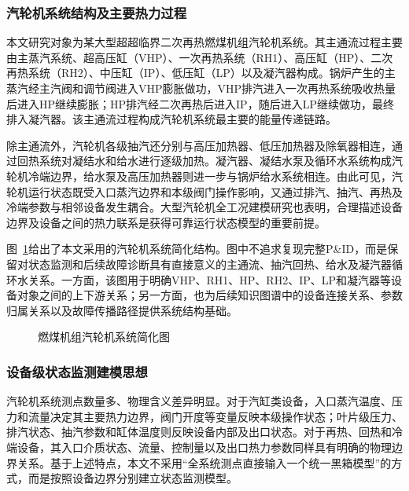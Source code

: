 \subsubsection{汽轮机系统结构及主要热力过程}

本文研究对象为某大型超超临界二次再热燃煤机组汽轮机系统。其主通流过程主要由主蒸汽系统、超高压缸（VHP）、一次再热系统（RH1）、高压缸（HP）、二次再热系统（RH2）、中压缸（IP）、低压缸（LP）以及凝汽器构成。锅炉产生的主蒸汽经主汽阀和调节阀进入VHP膨胀做功，VHP排汽进入一次再热系统吸收热量后进入HP继续膨胀；HP排汽经二次再热后进入IP，随后进入LP继续做功，最终排入凝汽器。该主通流过程构成汽轮机系统最主要的能量传递链路。

除主通流外，汽轮机各级抽汽还分别与高压加热器、低压加热器及除氧器相连，通过回热系统对凝结水和给水进行逐级加热。凝汽器、凝结水泵及循环水系统构成汽轮机冷端边界，给水泵及高压加热器则进一步与锅炉给水系统相连。由此可见，汽轮机运行状态既受入口蒸汽边界和本级阀门操作影响，又通过排汽、抽汽、再热及冷端参数与相邻设备发生耦合。大型汽轮机全工况建模研究也表明，合理描述设备边界及设备之间的热力联系是获得可靠运行状态模型的重要前提\cite{Zhang2018AllCondition,Dettori2017MonitoringModels}。

图~\ref{fig:turbine_system_modeling}给出了本文采用的汽轮机系统简化结构。图中不追求复现完整P\&ID，而是保留对状态监测和后续故障诊断具有直接意义的主通流、抽汽回热、给水及凝汽器循环水关系。一方面，该图用于明确VHP、RH1、HP、RH2、IP、LP和凝汽器等设备对象之间的上下游关系；另一方面，也为后续知识图谱中的设备连接关系、参数归属关系以及故障传播路径提供系统结构基础。

\begin{figure}[htbp]
    \centering
    \caption{燃煤机组汽轮机系统简化图}
    \label{fig:turbine_system_modeling}
\end{figure}

\subsubsection{设备级状态监测建模思想}

汽轮机系统测点数量多、物理含义差异明显。对于汽缸类设备，入口蒸汽温度、压力和流量决定其主要热力边界，阀门开度等变量反映本级操作状态；叶片级压力、排汽状态、抽汽参数和缸体温度则反映设备内部及出口状态。对于再热、回热和冷端设备，其入口介质状态、流量、控制量以及出口热力参数同样具有明确的物理边界关系。基于上述特点，本文不采用“全系统测点直接输入一个统一黑箱模型”的方式，而是按照设备边界分别建立状态监测模型。

